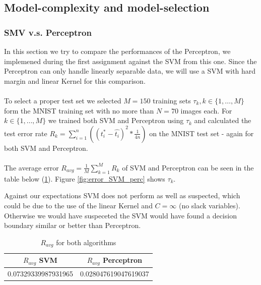 \subsection{Model-complexity and model-selection}

\subsubsection{SMV v.s. Perceptron}

In this section we try to compare the performances of the Perceptron, we implemened during the first assignment against the SVM from this one.
Since the Perceptron can only handle linearly separable data, we will use a SVM with hard margin and linear Kernel for this comparison.
\\
\\
To select a proper test set we selected $M = 150$ training sets $\tau _{k},k \in \{1,\ldots,M\}$ form the MNIST training set with no more than $N = 70$ images each.
For $k \in \{1,\ldots,M\}$ we trained both SVM and Perceptron using $\tau_k$ and calculated the test error rate $R_k = \sum_{i=1}^{n}( (t_{i}^{\ast} - \hat{t_{i}} )^2 * \frac{1}{4n} ) $ on the {MNIST} test set - again for both SVM and Perceptron.
\\
\\
The average error $R_{avg} = \frac{1}{M}\sum_{k=1}^M R_k$ of SVM and Perceptron can be seen in the table below (\ref{tab:avg_error}).
Figure \ref{fig:error_SVM_perc} shows $\tau_k$.

Against our expectations SVM does not perform as well as suspected, which could be due to the use of the linear Kernel and $C=\infty$ (no slack variables). Otherwise we would have suspeceted the SVM would have found a decision boundary similar or better than Perceptron.

\begin{table}[!h]
 \begin{center}
\begin{tabular}{|c|c|}
 \hline
 \textbf{$R_{avg}$ SVM} & \textbf{ $R_{avg}$ Perceptron} \\
 \hline
 0.07329339987931965       &     0.028047619047619037      \\
 \hline
\end{tabular}
\caption{\label{tab:avg_error} $R_{avg}$ for both algorithms }
\end{center}
\end{table}


